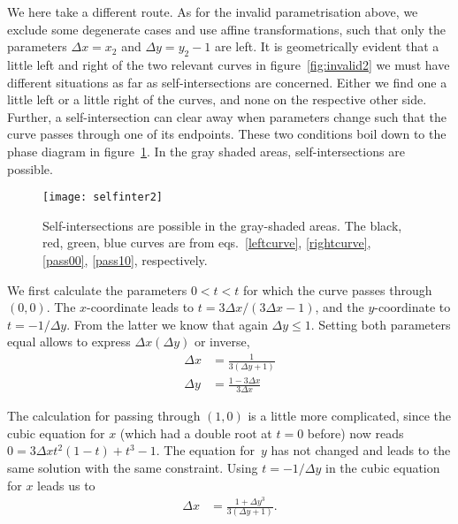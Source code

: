 \documentclass{article}
\begin{document}
We here take a different route. As for the invalid parametrisation above, we
exclude some degenerate cases and use affine transformations, such that only the
parameters $\Delta x=x_2$ and $\Delta y=y_2-1$ are left. It is geometrically
evident that a little left and right of the two relevant curves in
figure~\ref{fig:invalid2} we must have different situations as far as
self-intersections are concerned. Either we find one a little left or a little
right of the curves, and none on the respective other side. Further, a
self-intersection can clear away when parameters change such that the curve
passes through one of its endpoints. These two conditions boil down to the phase
diagram in figure~\ref{fig:selfinter2}. In the gray shaded areas,
self-intersections are possible.
%
\begin{figure}[t]
  \texttt{[image: selfinter2]}%
  \caption{Self-intersections are possible in the gray-shaded areas. The black,
  red, green, blue curves are from eqs.~\eqref{leftcurve}, \eqref{rightcurve},
  \eqref{pass00}, \eqref{pass10}, respectively.}%
  \label{fig:selfinter2}%
\end{figure}
%

We first calculate the parameters $0<t<t$ for which the curve passes through
$(0,0)$. The $x$-coordinate leads to $t=3\Delta x/(3\Delta x - 1)$, and the
$y$-coordinate to $t=-1/\Delta y$. From the latter we know that again $\Delta
y\leq 1$. Setting both parameters equal allows to express $\Delta x(\Delta y)$
or inverse,
%
\begin{align}
  \label{pass00}
  \Delta x &= \frac{1}{3(\Delta y+1)} \\
  \Delta y &= \frac{1-3\Delta x}{3\Delta x}
\end{align}
%

The calculation for passing through $(1,0)$ is a little more complicated, since
the cubic equation for $x$ (which had a double root at $t=0$ before) now reads
$0 = 3\Delta xt^2(1-t) + t^3 - 1$. The equation for~$y$ has not changed and
leads to the same solution with the same constraint. Using $t=-1/\Delta y$ in
the cubic equation for $x$ leads us to
%
\begin{align}
  \label{pass10}
  \Delta x &= \frac{1+\Delta y^3}{3(\Delta y+1)}.
\end{align}
%
\end{document}
